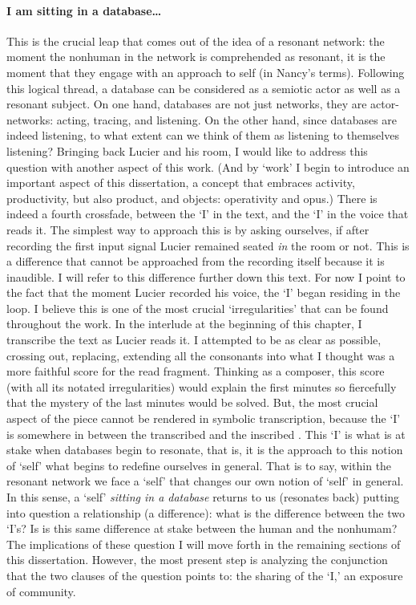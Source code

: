 \paragraph{I am sitting in a database\dots}
This is the crucial leap that comes out of the idea of a resonant network: the moment the nonhuman in the network is comprehended as resonant, it is the moment that they engage with an approach to self (in Nancy's terms). Following this logical thread, a database can be considered as a semiotic actor as well as a resonant subject. On one hand, databases are not just networks, they are actor-networks: acting, tracing, and listening. On the other hand, since databases are indeed listening, to what extent can we think of them as listening to themselves listening? Bringing back Lucier and his room, I would like to address this question with another aspect of this work. (And by `work' I begin to introduce an important aspect of this dissertation, a concept that embraces activity, productivity, but also product, and objects: operativity and opus.) There is indeed a fourth crossfade, between the `I' in the text, and the `I' in the voice that reads it. The simplest way to approach this is by asking ourselves, if after recording the first input signal Lucier remained seated \textit{in} the room or not. This is a difference that cannot be approached from the recording itself because it is inaudible. I will refer to this difference further down this text. For now I point to the fact that the moment Lucier recorded his voice, the `I' began residing in the loop. I believe this is one of the most crucial `irregularities' that can be found throughout the work. In the interlude at the beginning of this chapter, I transcribe the text as Lucier reads it. I attempted to be as clear as possible, crossing out, replacing, extending all the consonants into what I thought was a more faithful score for the read fragment. Thinking as a composer, this score (with all its notated irregularities) would explain the first minutes so fiercefully that the mystery of the last minutes would be solved. But, the most crucial aspect of the piece cannot be rendered in symbolic transcription, because the `I' is somewhere in between the transcribed and the inscribed . This `I' is what is at stake when databases begin to resonate, that is, it is the approach to this notion of `self' what begins to redefine ourselves in general. That is to say, within the resonant network we face a `self' that changes our own notion of `self' in general. In this sense, a `self' \textit{sitting in a database} returns to us (resonates back) putting into question a relationship (a difference): what is the difference between the two `I's? Is is this same difference at stake between the human and the nonhumam? The implications of these question I will move forth in the remaining sections of this dissertation. However, the most present step is analyzing the conjunction that the two clauses of the question points to: the sharing of the `I,' an exposure of community.

